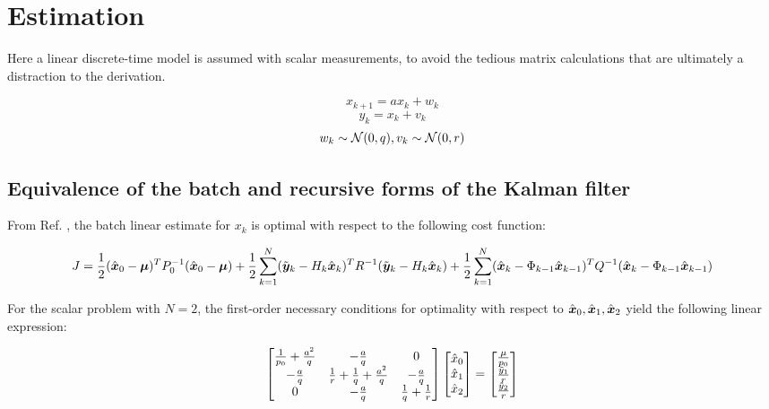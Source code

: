 
\chapter{Estimation}

Here a linear discrete-time model is assumed with scalar measurements, to avoid the tedious matrix calculations that are ultimately a distraction to the derivation.

\begin{equation}
x_{k+1} = a x_k + w_k
\end{equation}
\begin{equation}
y_k = x_k + v_k
\end{equation}
\begin{equation}
w_k \sim \mathcal{N}(0,q),
v_k \sim \mathcal{N}(0,r)
\end{equation}

\section{Equivalence of the batch and recursive forms of the Kalman filter}

From Ref. \cite{sorenson1970}, the batch linear estimate for $x_k$ is optimal with respect to the following cost function:

\begin{equation}
J = \frac{1}{2} (\hat{\bm{x}}_0-\bm{\mu})^T P_0^{-1} (\hat{\bm{x}}_0-\bm{\mu}) + 
\frac{1}{2} \sum_{k=1}^N (\tilde{\bm{y}}_k - H_k \hat{\bm{x}}_k)^T R^{-1} (\tilde{\bm{y}}_k - H_k \hat{\bm{x}}_k) + 
\frac{1}{2} \sum_{k=1}^N (\hat{\bm{x}}_k - \Phi_{k-1} \hat{\bm{x}}_{k-1})^T Q^{-1} (\hat{\bm{x}}_k - \Phi_{k-1} \hat{\bm{x}}_{k-1})
\end{equation}

For the scalar problem with $N = 2$, the first-order necessary conditions for optimality with respect to $\hat{\bm{x}}_0,\hat{\bm{x}}_1,\hat{\bm{x}}_2$ yield the following linear expression:

\begin{equation}
\begin{bmatrix}
\frac{1}{p_0}+\frac{a^2}{q} & -\frac{a}{q} & 0\\
-\frac{a}{q} & \frac{1}{r} + \frac{1}{q} + \frac{a^2}{q} & -\frac{a}{q} \\
0 & -\frac{a}{q} & \frac{1}{q}+\frac{1}{r}
\end{bmatrix}
\begin{bmatrix}
\hat{x}_0 \\ \hat{x}_1 \\ \hat{x}_2
\end{bmatrix} = \begin{bmatrix}
\frac{\mu}{p_0} \\ \frac{\tilde{y}_1}{r} \\ \frac{\tilde{y}_2}{r}
\end{bmatrix}
\end{equation}

